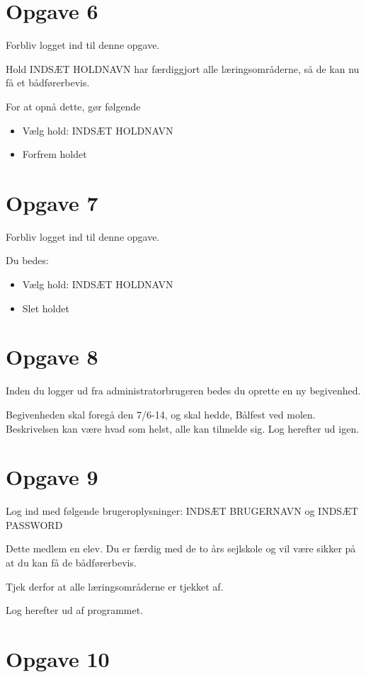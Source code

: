 \section{Opgave 6}

Forbliv logget ind til denne opgave.

Hold INDSÆT HOLDNAVN har færdiggjort alle læringsområderne, så de kan nu få et bådførerbevis.

For at opnå dette, gør følgende
\begin{itemize}
\item Vælg hold: INDSÆT HOLDNAVN
\item Forfrem holdet
\end{itemize}


\section{Opgave 7}

Forbliv logget ind til denne opgave.

Du bedes:
\begin{itemize}
\item Vælg hold: INDSÆT HOLDNAVN
\item Slet holdet
\end{itemize}


\section{Opgave 8}

Inden du logger ud fra administratorbrugeren bedes du oprette en ny begivenhed.

Begivenheden skal foregå den 7/6-14, og skal hedde, Bålfest ved molen. Beskrivelsen kan være hvad som helst, alle kan tilmelde sig. Log herefter ud igen.


\section{Opgave 9}

Log ind med følgende brugeroplysninger: INDSÆT BRUGERNAVN og INDSÆT PASSWORD

Dette medlem en elev. Du er færdig med de to års sejlskole og vil være sikker på at du kan få de bådførerbevis.

Tjek derfor at alle læringsområderne er tjekket af.

Log herefter ud af programmet.


\section{Opgave 10}

